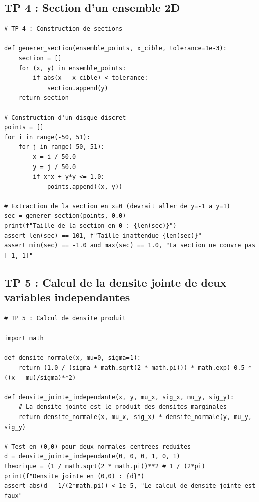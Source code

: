 \documentclass[11pt,a4paper]{article}
\begin{document}
\subsection*{TP 4 : Section d'un ensemble 2D}
\begin{lstlisting}
# TP 4 : Construction de sections

def generer_section(ensemble_points, x_cible, tolerance=1e-3):
    section = []
    for (x, y) in ensemble_points:
        if abs(x - x_cible) < tolerance:
            section.append(y)
    return section

# Construction d'un disque discret
points = []
for i in range(-50, 51):
    for j in range(-50, 51):
        x = i / 50.0
        y = j / 50.0
        if x*x + y*y <= 1.0:
            points.append((x, y))

# Extraction de la section en x=0 (devrait aller de y=-1 a y=1)
sec = generer_section(points, 0.0)
print(f"Taille de la section en 0 : {len(sec)}")
assert len(sec) == 101, f"Taille inattendue {len(sec)}"
assert min(sec) == -1.0 and max(sec) == 1.0, "La section ne couvre pas [-1, 1]"
\end{lstlisting}

\subsection*{TP 5 : Calcul de la densite jointe de deux variables independantes}
\begin{lstlisting}
# TP 5 : Calcul de densite produit

import math

def densite_normale(x, mu=0, sigma=1):
    return (1.0 / (sigma * math.sqrt(2 * math.pi))) * math.exp(-0.5 * ((x - mu)/sigma)**2)

def densite_jointe_independante(x, y, mu_x, sig_x, mu_y, sig_y):
    # La densite jointe est le produit des densites marginales
    return densite_normale(x, mu_x, sig_x) * densite_normale(y, mu_y, sig_y)

# Test en (0,0) pour deux normales centrees reduites
d = densite_jointe_independante(0, 0, 0, 1, 0, 1)
theorique = (1 / math.sqrt(2 * math.pi))**2 # 1 / (2*pi)
print(f"Densite jointe en (0,0) : {d}")
assert abs(d - 1/(2*math.pi)) < 1e-5, "Le calcul de densite jointe est faux"
\end{lstlisting}
\end{document}
